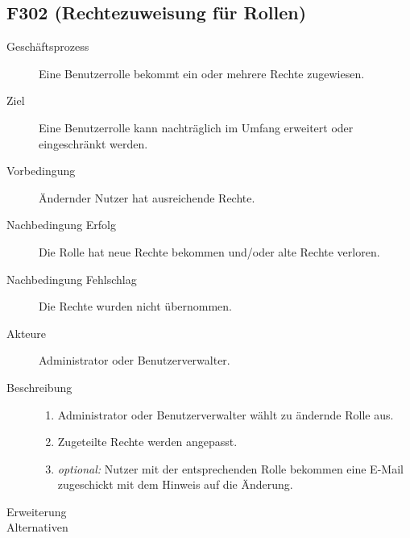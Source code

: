 \subsection{F302 (Rechtezuweisung für Rollen)} 
\begin{description}
  \item[Geschäftsprozess]Eine Benutzerrolle bekommt ein oder mehrere Rechte zugewiesen.
  \item[Ziel]Eine Benutzerrolle kann nachträglich im Umfang erweitert oder eingeschränkt werden.
  \item[Vorbedingung]Ändernder Nutzer hat ausreichende Rechte.
  \item[Nachbedingung Erfolg]Die Rolle hat neue Rechte bekommen und/oder alte Rechte verloren.
  \item[Nachbedingung Fehlschlag]Die Rechte wurden nicht übernommen.
  \item[Akteure]Administrator oder Benutzerverwalter.
  \item[Beschreibung]\hfill
  \begin{enumerate}
  \item Administrator oder Benutzerverwalter wählt zu ändernde Rolle aus.
  \item Zugeteilte Rechte werden angepasst.
  \item \emph{optional:} Nutzer mit der entsprechenden Rolle bekommen eine E-Mail zugeschickt mit dem Hinweis auf die Änderung.
  \end{enumerate}
  \item[Erweiterung]
  \item[Alternativen]
\end{description}

